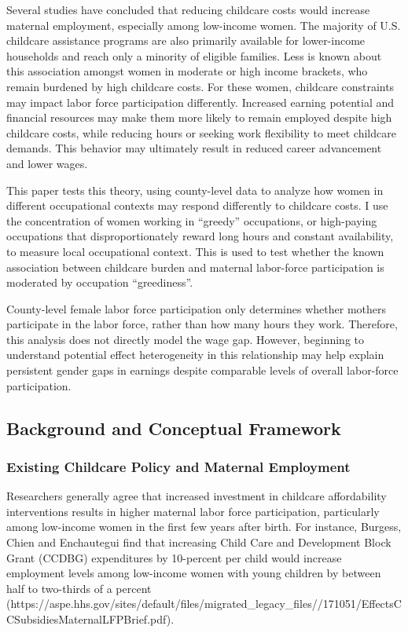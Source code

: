 \documentclass[
  letterpaper,
  DIV=11,
  numbers=noendperiod]{scrartcl}
\begin{document}
Several studies have concluded that reducing childcare costs would
increase maternal employment, especially among low-income women. The
majority of U.S. childcare assistance programs are also primarily
available for lower-income households and reach only a minority of
eligible families. Less is known about this association amongst women in
moderate or high income brackets, who remain burdened by high childcare
costs. For these women, childcare constraints may impact labor force
participation differently. Increased earning potential and financial
resources may make them more likely to remain employed despite high
childcare costs, while reducing hours or seeking work flexibility to
meet childcare demands. This behavior may ultimately result in reduced
career advancement and lower wages.

This paper tests this theory, using county-level data to analyze how
women in different occupational contexts may respond differently to
childcare costs. I use the concentration of women working in ``greedy''
occupations, or high-paying occupations that disproportionately reward
long hours and constant availability, to measure local occupational
context. This is used to test whether the known association between
childcare burden and maternal labor-force participation is moderated by
occupation ``greediness''.

County-level female labor force participation only determines whether
mothers participate in the labor force, rather than how many hours they
work. Therefore, this analysis does not directly model the wage gap.
However, beginning to understand potential effect heterogeneity in this
relationship may help explain persistent gender gaps in earnings despite
comparable levels of overall labor-force participation.

\subsection{Background and Conceptual
Framework}\label{background-and-conceptual-framework}

\subsubsection{Existing Childcare Policy and Maternal
Employment}\label{existing-childcare-policy-and-maternal-employment}

Researchers generally agree that increased investment in childcare
affordability interventions results in higher maternal labor force
participation, particularly among low-income women in the first few
years after birth. For instance, Burgess, Chien and Enchautegui find
that increasing Child Care and Development Block Grant (CCDBG)
expenditures by 10-percent per child would increase employment levels
among low-income women with young children by between half to two-thirds
of a percent
(https://aspe.hhs.gov/sites/default/files/migrated\_legacy\_files//171051/EffectsCCSubsidiesMaternalLFPBrief.pdf).
\end{document}
